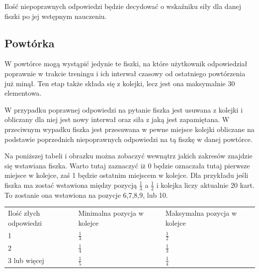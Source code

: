 Ilość niepoprawnych odpowiedzi będzie decydować o wskaźniku siły dla danej fiszki po jej wstępnym nauczeniu.

\subsection{Powtórka}
\label{sub:powtorka}
W powtórce mogą wystąpić jedynie te fiszki, na które użytkownik odpowiedział poprawnie w trakcie treningu i ich interwał czasowy od ostatniego powtórzenia już minął. Ten etap także składa się z kolejki, lecz jest ona maksymalnie 30 elementowa. 

W przypadku poprawnej odpowiedzi na pytanie fiszka jest usuwana z kolejki i obliczany dla niej jest nowy interwał oraz siła z jaką jest zapamiętana. W przeciwnym wypadku fiszka jest przesuwana w pewne miejsce kolejki obliczane na podstawie poprzednich niepoprawnych odpowiedzi na tą fiszkę w danej powtórce. 

Na poniższej tabeli i obrazku można zobaczyć wewnątrz jakich zakresów znajdzie się wstawiana fiszka. Warto tutaj zaznaczyć iż 0 będzie oznaczała tutaj pierwsze miejsce w kolejce, zaś 1 będzie ostatnim miejscem w kolejce.
Dla przykładu jeśli fiszka ma zostać wstawiona między pozycją $\frac{1}{3}$ a $\frac{1}{2}$ i kolejka liczy aktualnie 20 kart. To zostanie ona wstawiona na pozycje 6,7,8,9, lub 10.


\begin{center}
\begin{tabular}{| l | l | l |}
\hline
Ilość złych odpowiedzi  & Minimalna pozycja w kolejce & Maksymalna pozycja w kolejce \\ \Xhline{3\arrayrulewidth}

1 & $\frac{1}{3}$ & $\frac{1}{2}$   \\ \hline
2 & $\frac{1}{4}$  & $\frac{1}{3}$   \\ \hline
3 lub więcej & $\frac{1}{5}$   & $\frac{1}{4}$   \\ \hline
\end{tabular}
\label{table:internals}

\end{center}


